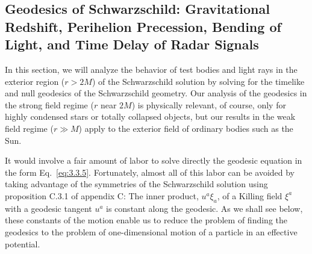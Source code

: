 
\subsection{Geodesics of Schwarzschild: Gravitational Redshift, Perihelion
Precession, Bending of Light, and Time Delay of Radar Signals}\label{sec:6.3}

In this section, we will analyze the behavior of test bodies and light rays in
the exterior region (\(r>2M\)) of the Schwarzschild solution by solving for the
timelike and null geodesics of the Schwarzschild geometry. Our analysis of the
geodesics in the strong field regime (\(r\) near \(2M\)) is physically relevant,
of course, only for highly condensed stars or totally collapsed objects, but our
results in the weak field regime (\(r\gg M\)) apply to the exterior field of
ordinary bodies such as the Sun.

It would involve a fair amount of labor to solve directly the geodesic equation
in the form Eq.~\eqref{eq:3.3.5}. Fortunately, almost all of this labor can be
avoided by taking advantage of the symmetries of the Schwarzschild solution using
proposition C.3.1 of appendix C: The inner product, \(u^a\xi_a\), of a Killing
field \(\xi^a\) with a geodesic tangent \(u^a\) is constant along the geodesic. As
we shall see below, these constants of the motion enable us to reduce the problem
of finding the geodesics to the problem of one-dimensional motion of a particle in
an effective potential.

